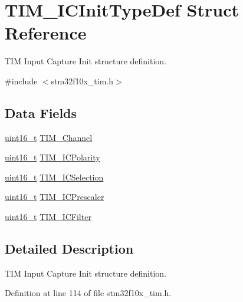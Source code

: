 \hypertarget{struct_t_i_m___i_c_init_type_def}{\section{T\-I\-M\-\_\-\-I\-C\-Init\-Type\-Def Struct Reference}
\label{struct_t_i_m___i_c_init_type_def}
}


T\-I\-M Input Capture Init structure definition.  




{\ttfamily \#include $<$stm32f10x\-\_\-tim.\-h$>$}

\subsection*{Data Fields}
\begin{DoxyCompactItemize}
\item 
\hyperlink{stdint_8h_a273cf69d639a59973b6019625df33e30}{uint16\-\_\-t} \hyperlink{struct_t_i_m___i_c_init_type_def_ab9404ee3d95aaa7a478ed99562c736d2}{T\-I\-M\-\_\-\-Channel}
\item 
\hyperlink{stdint_8h_a273cf69d639a59973b6019625df33e30}{uint16\-\_\-t} \hyperlink{struct_t_i_m___i_c_init_type_def_a234c284efc36c0cc15a2ed0fb4435557}{T\-I\-M\-\_\-\-I\-C\-Polarity}
\item 
\hyperlink{stdint_8h_a273cf69d639a59973b6019625df33e30}{uint16\-\_\-t} \hyperlink{struct_t_i_m___i_c_init_type_def_a00b9a72e895a43dc18c69c96a149f080}{T\-I\-M\-\_\-\-I\-C\-Selection}
\item 
\hyperlink{stdint_8h_a273cf69d639a59973b6019625df33e30}{uint16\-\_\-t} \hyperlink{struct_t_i_m___i_c_init_type_def_ac61c7fc999ace295ac81b304cabd61e0}{T\-I\-M\-\_\-\-I\-C\-Prescaler}
\item 
\hyperlink{stdint_8h_a273cf69d639a59973b6019625df33e30}{uint16\-\_\-t} \hyperlink{struct_t_i_m___i_c_init_type_def_a72539caa6e965e4fa89e3b21b188cf26}{T\-I\-M\-\_\-\-I\-C\-Filter}
\end{DoxyCompactItemize}


\subsection{Detailed Description}
T\-I\-M Input Capture Init structure definition. 

Definition at line 114 of file stm32f10x\-\_\-tim.\-h.



